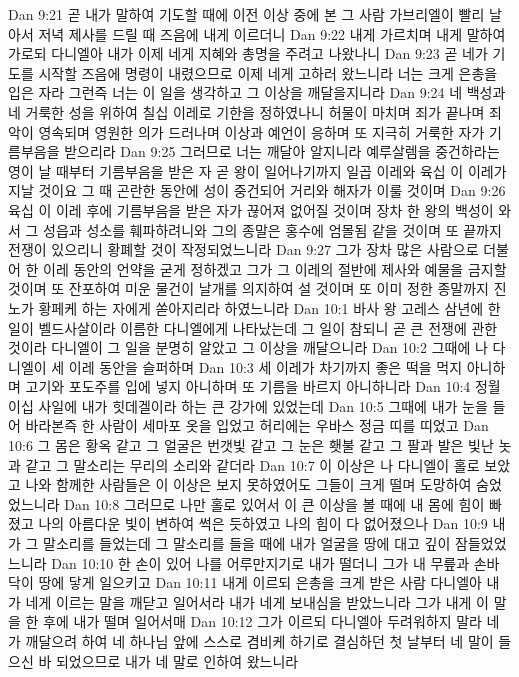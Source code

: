 Dan 9:21  곧 내가 말하여 기도할 때에 이전 이상 중에 본 그 사람 가브리엘이 빨리 날아서 저녁 제사를 드릴 때 즈음에 내게 이르더니
Dan 9:22  내게 가르치며 내게 말하여 가로되 다니엘아 내가 이제 네게 지혜와 총명을 주려고 나왔나니
Dan 9:23  곧 네가 기도를 시작할 즈음에 명령이 내렸으므로 이제 네게 고하러 왔느니라 너는 크게 은총을 입은 자라 그런즉 너는 이 일을 생각하고 그 이상을 깨달을지니라
Dan 9:24  네 백성과 네 거룩한 성을 위하여 칠십 이레로 기한을 정하였나니 허물이 마치며 죄가 끝나며 죄악이 영속되며 영원한 의가 드러나며 이상과 예언이 응하며 또 지극히 거룩한 자가 기름부음을 받으리라
Dan 9:25  그러므로 너는 깨달아 알지니라 예루살렘을 중건하라는 영이 날 때부터 기름부음을 받은 자 곧 왕이 일어나기까지 일곱 이레와 육십 이 이레가 지날 것이요 그 때 곤란한 동안에 성이 중건되어 거리와 해자가 이룰 것이며
Dan 9:26  육십 이 이레 후에 기름부음을 받은 자가 끊어져 없어질 것이며 장차 한 왕의 백성이 와서 그 성읍과 성소를 훼파하려니와 그의 종말은 홍수에 엄몰됨 같을 것이며 또 끝까지 전쟁이 있으리니 황폐할 것이 작정되었느니라
Dan 9:27  그가 장차 많은 사람으로 더불어 한 이레 동안의 언약을 굳게 정하겠고 그가 그 이레의 절반에 제사와 예물을 금지할 것이며 또 잔포하여 미운 물건이 날개를 의지하여 설 것이며 또 이미 정한 종말까지 진노가 황페케 하는 자에게 쏟아지리라 하였느니라
Dan 10:1  바사 왕 고레스 삼년에 한 일이 벨드사살이라 이름한 다니엘에게 나타났는데 그 일이 참되니 곧 큰 전쟁에 관한 것이라 다니엘이 그 일을 분명히 알았고 그 이상을 깨달으니라
Dan 10:2  그때에 나 다니엘이 세 이레 동안을 슬퍼하며
Dan 10:3  세 이레가 차기까지 좋은 떡을 먹지 아니하며 고기와 포도주를 입에 넣지 아니하며 또 기름을 바르지 아니하니라
Dan 10:4  정월 이십 사일에 내가 힛데겔이라 하는 큰 강가에 있었는데
Dan 10:5  그때에 내가 눈을 들어 바라본즉 한 사람이 세마포 옷을 입었고 허리에는 우바스 정금 띠를 띠었고
Dan 10:6  그 몸은 황옥 같고 그 얼굴은 번갯빛 같고 그 눈은 횃불 같고 그 팔과 발은 빛난 놋과 같고 그 말소리는 무리의 소리와 같더라
Dan 10:7  이 이상은 나 다니엘이 홀로 보았고 나와 함께한 사람들은 이 이상은 보지 못하였어도 그들이 크게 떨며 도망하여 숨었었느니라
Dan 10:8  그러므로 나만 홀로 있어서 이 큰 이상을 볼 때에 내 몸에 힘이 빠졌고 나의 아름다운 빛이 변하여 썩은 듯하였고 나의 힘이 다 없어졌으나
Dan 10:9  내가 그 말소리를 들었는데 그 말소리를 들을 때에 내가 얼굴을 땅에 대고 깊이 잠들었었느니라
Dan 10:10  한 손이 있어 나를 어루만지기로 내가 떨더니 그가 내 무릎과 손바닥이 땅에 닿게 일으키고
Dan 10:11  내게 이르되 은총을 크게 받은 사람 다니엘아 내가 네게 이르는 말을 깨닫고 일어서라 내가 네게 보내심을 받았느니라 그가 내게 이 말을 한 후에 내가 떨며 일어서매
Dan 10:12  그가 이르되 다니엘아 두려워하지 말라 네가 깨달으려 하여 네 하나님 앞에 스스로 겸비케 하기로 결심하던 첫 날부터 네 말이 들으신 바 되었으므로 내가 네 말로 인하여 왔느니라
